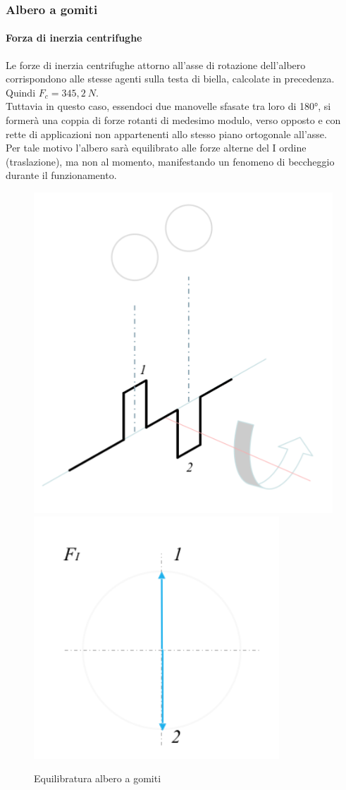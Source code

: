 \subsubsection{Albero a gomiti}
\paragraph{Forza di inerzia centrifughe}
Le forze di inerzia centrifughe attorno all’asse di rotazione dell’albero corrispondono alle stesse agenti sulla testa di biella, calcolate in precedenza.\\
Quindi $F_c=345,2\ N$.\\
Tuttavia in questo caso, essendoci due manovelle sfasate tra loro di 180°, si formerà una coppia di forze rotanti di medesimo modulo, verso opposto e con rette di applicazioni non appartenenti allo stesso piano ortogonale all’asse.\\
Per tale motivo l’albero sarà equilibrato alle forze alterne del I ordine (traslazione), ma non al momento, manifestando un fenomeno di beccheggio durante il funzionamento. 
\begin{figure}[h]
\centering
   {\includegraphics[width=.3\textwidth]{Immagini/Equilibratura1.png}} \quad
   {\includegraphics[width=.35\textwidth]{Immagini/Equilibratura2.png}}
\caption{Equilibratura albero a gomiti}
\label{fig:Equilibratura}
\end{figure}
